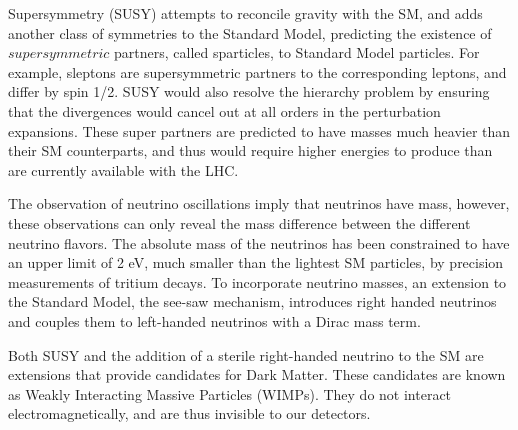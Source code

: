 \documentclass[11pt,a4paper]{report}
\begin{document}
Supersymmetry (SUSY) attempts to reconcile gravity with the SM, and adds another class of symmetries to the Standard Model, predicting the existence of $supersymmetric$ partners, called sparticles, to Standard Model particles. For example, sleptons are supersymmetric partners to the corresponding leptons, and differ by spin 1/2. SUSY would also resolve the hierarchy problem by ensuring that the divergences would cancel out at all orders in the perturbation expansions. These super partners are predicted to have masses much heavier than their SM counterparts, and thus would require higher energies to produce than are currently available with the LHC.

The observation of neutrino oscillations imply that neutrinos have mass, however, these observations can only reveal the mass difference between the different neutrino flavors. The absolute mass of the neutrinos has been constrained to have an upper limit of 2 eV, much smaller than the lightest SM particles, by precision measurements of tritium decays. To incorporate neutrino masses, an extension to the Standard Model, the see-saw mechanism, introduces right handed neutrinos and couples them to left-handed neutrinos with a Dirac mass term.

Both SUSY and the addition of a sterile right-handed neutrino to the SM are extensions that provide candidates for Dark Matter. These candidates are known as Weakly Interacting Massive Particles (WIMPs). They do not interact electromagnetically, and are thus invisible to our detectors.
\end{document}
